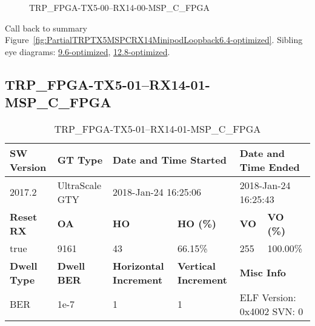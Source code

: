 \begin{figure}[h]
\caption{TRP\_FPGA-TX5-00--RX14-00-MSP\_C\_FPGA} \label{fig:TRPFPGATX500RX1400MSPCFPGA6.4-optimized}
\end{figure}

Call back to summary Figure~\ref{fig:PartialTRPTX5MSPCRX14MinipodLoopback6.4-optimized}.
Sibling eye diagrams: \hyperref[sec:TRPFPGATX500RX1400MSPCFPGA9.6-optimized]{9.6-optimized}, \hyperref[sec:TRPFPGATX500RX1400MSPCFPGA12.8-optimized]{12.8-optimized}.

\clearpage
\newpage


\subsection{TRP\_FPGA-TX5-01--RX14-01-MSP\_C\_FPGA}\label{sec:TRPFPGATX501RX1401MSPCFPGA6.4-optimized}

\begin{table}[h]
\centering
\caption{TRP\_FPGA-TX5-01--RX14-01-MSP\_C\_FPGA}
\label{tab:TRPFPGATX501RX1401MSPCFPGA6.4-optimized}
\begin{tabular}{@{}|l|l|l|l|l|l|@{}}
\toprule
\textbf{SW Version}                & \textbf{GT Type}   & \multicolumn{2}{l|}{\textbf{Date and Time Started}}            & \multicolumn{2}{l|}{\textbf{Date and Time Ended}}        \\ \midrule
2017.2                       & UltraScale GTY          & \multicolumn{2}{l|}{2018-Jan-24 16:25:06}                   & \multicolumn{2}{l|}{2018-Jan-24 16:25:43}               \\ \midrule
\textbf{Reset RX}                  & \textbf{OA} & \textbf{HO}   & \textbf{HO (\%)} & \textbf{VO} & \textbf{VO (\%)} \\ \midrule
true & 9161        & 43          & 66.15\%        & 255        & 100.00\%       \\ \midrule
\textbf{Dwell Type}                & \textbf{Dwell BER} & \textbf{Horizontal Increment} & \textbf{Vertical Increment}    & \multicolumn{2}{l|}{\textbf{Misc Info}}                  \\ \midrule
BER                            & 1e-7        & 1        & 1           & \multicolumn{2}{l|}{ELF Version: 0x4002 SVN: 0}                         \\ \bottomrule
\end{tabular}
\end{table}

